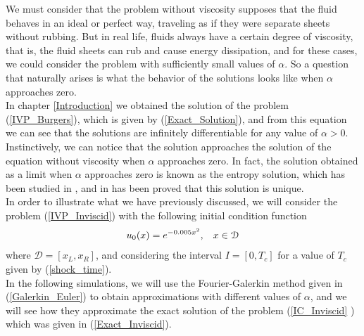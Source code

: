 	We must consider that the problem without viscosity supposes that the fluid behaves in an ideal or perfect way, traveling as if they were separate sheets without rubbing. But in real life, fluids always have a certain degree of viscosity, that is, the fluid sheets can rub and cause energy dissipation, and for these cases, we could consider the problem with sufficiently small values ​​of $\alpha$. So a question that naturally arises is what the behavior of the solutions looks like when $\alpha$ approaches zero. \\
	
	In chapter \ref{Introduction} we obtained the solution of the problem (\ref{IVP_Burgers}), which is given by (\ref{Exact_Solution}), and from this equation we can see that the solutions are infinitely differentiable for any value of $\alpha> 0$. Instinctively, we can notice that the solution approaches the solution of the equation without viscosity when $\alpha$ approaches zero. In fact, the solution obtained as a limit when $\alpha$ approaches zero is known as the entropy solution, which has been studied in \cite{Tadmor1989}, \cite{Maday1989} and in \cite{Kruzkov1970} has been proved that this solution is unique. \\
	
	In order to illustrate what we have previously discussed, we will consider the problem (\ref{IVP_Inviscid}) with the following initial condition function
	\begin{align}
	\label{IC_Inviscid}	
		u_0 (x) = e^{-0.005x^2}, \hspace{3mm} x \in \mathcal{D}
	\end{align}
	where $\mathcal{D} = [x_L, x_R]$, and considering the interval $I = [0, T_c]$ for a value of $T_c$ given by (\ref{shock_time}). \\
	
	In the following simulations, we will use the Fourier-Galerkin method given in (\ref{Galerkin_Euler}) to obtain approximations with different values of $\alpha$, and we will see how they approximate the exact solution of the problem (\ref{IC_Inviscid} ) which was given in (\ref {Exact_Inviscid}).
	
